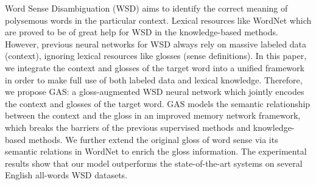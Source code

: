 Word Sense Disambiguation (WSD) aims to identify the correct meaning of polysemous words in the particular context. Lexical resources like WordNet which are proved to be of great help for WSD in the knowledge-based methods. However, previous neural networks for WSD always rely on massive labeled data (context), ignoring lexical resources like glosses (sense definitions). In this paper, we integrate the context and glosses of the target word into a unified framework in order to make full use of both labeled data and lexical knowledge. Therefore, we propose GAS: a gloss-augmented WSD neural network which jointly encodes the context and glosses of the target word. GAS models the semantic relationship between the context and the gloss in an improved memory network framework, which breaks the barriers of the previous supervised methods and knowledge-based methods. We further extend the original gloss of word sense via its semantic relations in WordNet to enrich the gloss information. The experimental results show that our model outperforms the state-of-the-art systems on several English all-words WSD datasets.
